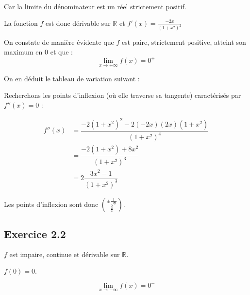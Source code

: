 \documentclass[a4paper,10pt]{report}
\begin{document}
Car la limite du dénominateur est un réel strictement positif.

La fonction $f$ est donc dérivable sur $\mathbb{R}$ et $f'(x) = \frac{-2x}{(1+x^2)^2}$

On constate de manière évidente que $f$ est paire, strictement positive, atteint son maximum en $0$ et que :
\begin{displaymath}
	\lim_{x \rightarrow \pm \infty} f(x) = 0^{+}
\end{displaymath}


On en déduit le tableau de variation suivant :


Recherchons les points d'inflexion (où elle traverse sa tangente) caractérisés par $f''(x)=0$ :

\begin{equation*}
	\begin{split}
		f''(x) &= \dfrac{-2(1+x^2)^2-2(-2x)(2x)(1+x^2)}{(1+x^2)^4} \\
		       &= \dfrac{-2(1+x^2)+8x^2}{(1+x^2)^3} \\
		       &= 2\dfrac{3x^2-1}{(1+x^2)^3} 
	\end{split}
\end{equation*}

Les points d'inflexion sont donc $\binom{\pm\frac{1}{\sqrt{3}}}{\frac{3}{4}}$.



\subsection*{Exercice 2.2}

$f$ est impaire, continue et dérivable sur $\mathbb{R}$.

$f(0) = 0$.

\begin{displaymath}
\lim_{x \rightarrow -\infty} f(x) = 0^{-}
\end{displaymath}
\end{document}
